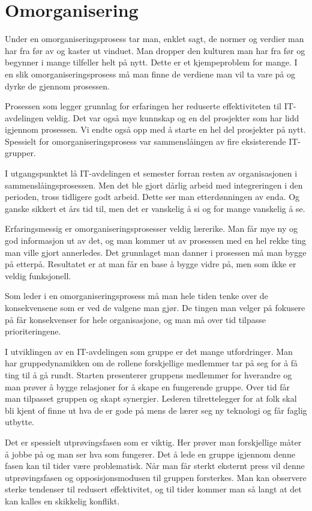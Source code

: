 \documentclass[12pt, a4paper]{article}
\begin{document}
\section{Omorganisering}

Under en omorganiseringsprosess tar man, enklet sagt, de normer og verdier man
har fra før av og kaster ut vinduet. Man dropper den kulturen man har fra før
og begynner i mange tilfeller helt på nytt. Dette er et kjempeproblem for
mange. I en slik omorganiseringsprosess må man finne de verdiene man vil ta
vare på og dyrke de gjennom prosessen. 

Prosessen som legger grunnlag for erfaringen her reduserte effektiviteten til
IT-avdelingen veldig. Det var også mye kunnskap og en del prosjekter som har
lidd igjennom prosessen. Vi endte også opp med å starte en hel del prosjekter
på nytt. Spessielt for omorganiseringsprosess var sammenslåingen av fire
eksisterende IT-grupper.

I utgangspunktet lå IT-avdelingen et semester forran resten av organisasjonen i
sammenslåingsprosessen. Men det ble gjort dårlig arbeid med integreringen i den
perioden, tross tidligere godt arbeid. Dette ser man etterdønningen av enda. Og
ganske sikkert et års tid til, men det er vanskelig å si og for mange vanskelig
å se.

Erfaringsmessig er omorganiseringsprosesser veldig lærerike. Man får mye ny og
god informasjon ut av det, og man kommer ut av prosessen med en hel rekke ting
man ville gjort annerledes. Det grunnlaget man danner i prosessen må man bygge
på etterpå. Resultatet er at man får en base å bygge vidre på, men som ikke er
veldig funksjonell.  

Som leder i en omorganiseringsprosess må man hele tiden tenke over de
konsekvensene som er ved de valgene man gjør. De tingen man velger på fokusere
på får konsekvenser for hele organisasjone, og man må over tid tilpasse
prioriteringene.   

I utviklingen av en IT-avdelingen som gruppe er det mange utfordringer. Man har
gruppedynamikken om de rollene forskjellige medlemmer tar på seg for å få ting
til å gå rundt. Starten presenterer gruppens medlemmer for hverandre og man
prøver å bygge relasjoner for å skape en fungerende gruppe. Over tid får man
tilpasset gruppen og skapt synergier. Lederen tilrettelegger for at folk skal
bli kjent of finne ut hva de er gode på mens de lærer seg ny teknologi og får
faglig utbytte.  

Det er spessielt utprøvingsfasen som er viktig. Her prøver man forskjellige
måter å jobbe på og man ser hva som fungerer. Det å lede en gruppe igjennom
denne fasen kan til tider være problematisk. Når man får sterkt eksternt press
vil denne utprøvingsfasen og opposisjonsmodusen til gruppen forsterkes. Man kan
observere sterke tendenser til redusert effektivitet, og til tider kommer man
så langt at det kan kalles en skikkelig konflikt. 
\end{document}
